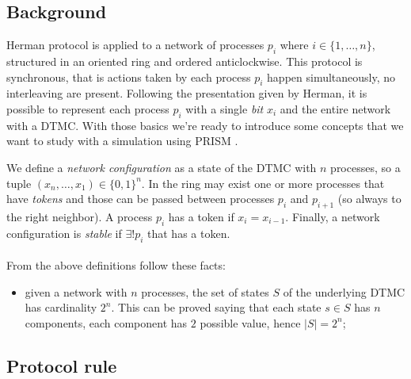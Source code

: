 \subsection{Background}

Herman protocol \cite{Her90} is applied to a network of processes
$p_i$ where $i \in \{1,\ldots, n\}$, structured in an oriented ring
and ordered anticlockwise. This protocol is synchronous, that is
actions taken by each process $p_i$ happen simultaneously, no
interleaving are present. Following the presentation given by Herman,
it is possible to represent each process $p_i$ with a single
\emph{bit} $x_i$ and the entire network with a DTMC. With those basics
we're ready to introduce some concepts that we want to study with a
simulation using PRISM \cite{KNP11}.

We define a \emph{network configuration} as a state of the DTMC with
$n$ processes, so a tuple $(x_n, \ldots, x_1) \in \{0,1\}^n$. In the
ring may exist one or more processes that have \emph{tokens} and those
can be passed between processes $p_i$ and $p_{i+1}$ (so always to the
right neighbor). A process $p_i$ has a token if $x_i =
x_{i-1}$. Finally, a network configuration is \emph{stable} if
$\exists! p_i$ that has a token.
\\\\
From the above definitions follow these facts:
\begin{itemize}
\item given a network with $n$ processes, the set of states $S$ of the
  underlying DTMC has cardinality $2^n$. This can be proved saying
  that each state $s\in S$ has $n$ components, each component has $2$
  possible value, hence $|S| = 2^n$;
\end{itemize}

\subsection{Protocol rule}

